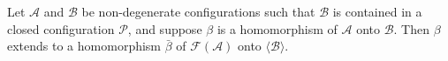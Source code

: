 Let $\mathcal{A}$ and $\mathcal{B}$ be non-degenerate configurations such that $\mathcal{B}$ is contained in a closed configuration $\mathcal{P}$, and suppose $\beta$ is a homomorphism of $\mathcal{A}$ onto $\mathcal{B}$. Then $\beta$ extends to a homomorphism $\bar{\beta}$ of $\mathcal{F}(\mathcal{A})$ onto $\langle \mathcal{B} \rangle$.
